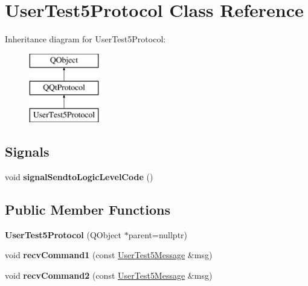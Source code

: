 \hypertarget{class_user_test5_protocol}{}\section{User\+Test5\+Protocol Class Reference}
\label{class_user_test5_protocol}
Inheritance diagram for User\+Test5\+Protocol\+:\begin{figure}[H]
\begin{center}
\leavevmode
\includegraphics[height=3.000000cm]{class_user_test5_protocol}
\end{center}
\end{figure}
\subsection*{Signals}
\begin{DoxyCompactItemize}
\item 
\mbox{\label{class_user_test5_protocol_ae9d66bbdcf2ebb218612eaf991ff4267}} 
void {\bfseries signal\+Sendto\+Logic\+Level\+Code} ()
\end{DoxyCompactItemize}
\subsection*{Public Member Functions}
\begin{DoxyCompactItemize}
\item 
\mbox{\label{class_user_test5_protocol_ae06d86586c1cd7dca4ae9bf510833b19}} 
{\bfseries User\+Test5\+Protocol} (Q\+Object $\ast$parent=nullptr)
\item 
\mbox{\label{class_user_test5_protocol_a220e1d7b56fd5d69883dd15211673dd0}} 
void {\bfseries recv\+Command1} (const \mbox{\hyperlink{class_user_test5_message}{User\+Test5\+Message}} \&msg)
\item 
\mbox{\label{class_user_test5_protocol_a62b7416d430257da9a6662bb2db84757}} 
void {\bfseries recv\+Command2} (const \mbox{\hyperlink{class_user_test5_message}{User\+Test5\+Message}} \&msg)
\end{DoxyCompactItemize}
